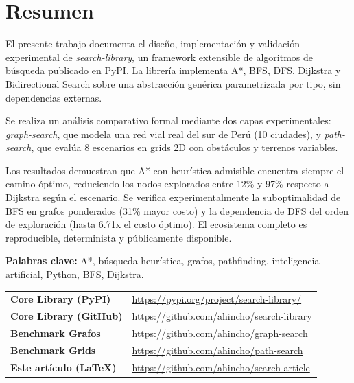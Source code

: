 \section*{Resumen}

El presente trabajo documenta el dise\~no, implementaci\'on y validaci\'on experimental de \textit{search-library}, un framework extensible de algoritmos de b\'usqueda publicado en PyPI. La librer\'ia implementa A*, BFS, DFS, Dijkstra y Bidirectional Search sobre una abstracci\'on gen\'erica parametrizada por tipo, sin dependencias externas.

Se realiza un an\'alisis comparativo formal mediante dos capas experimentales: \textit{graph-search}, que modela una red vial real del sur de Per\'u (10 ciudades), y \textit{path-search}, que eval\'ua 8 escenarios en grids 2D con obst\'aculos y terrenos variables.

Los resultados demuestran que A* con heur\'istica admisible encuentra siempre el camino \'optimo, reduciendo los nodos explorados entre 12\% y 97\% respecto a Dijkstra seg\'un el escenario. Se verifica experimentalmente la suboptimalidad de BFS en grafos ponderados (31\% mayor costo) y la dependencia de DFS del orden de exploraci\'on (hasta 6.71x el costo \'optimo). El ecosistema completo es reproducible, determinista y p\'ublicamente disponible.

\vspace{0.5cm}
\noindent\textbf{Palabras clave:} A*, b\'usqueda heur\'istica, grafos, pathfinding, inteligencia artificial, Python, BFS, Dijkstra.

\newpage

\begin{tcolorbox}[title=Repositorios y recursos del proyecto, breakable, colback=blue!2, colframe=blue!40!black]
\renewcommand{\arraystretch}{1.4}
\begin{tabular}{@{} >{\bfseries}l l @{}}
    Core Library (PyPI) & \url{https://pypi.org/project/search-library/} \\
    Core Library (GitHub) & \url{https://github.com/ahincho/search-library} \\
    Benchmark Grafos & \url{https://github.com/ahincho/graph-search} \\
    Benchmark Grids & \url{https://github.com/ahincho/path-search} \\
    Este art\'iculo (LaTeX) & \url{https://github.com/ahincho/search-article} \\
\end{tabular}
\end{tcolorbox}










\newpage




